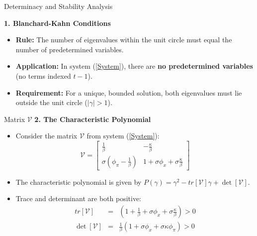\documentclass[11pt,aspectratio=169]{beamer}
\begin{document}
\begin{frame}{Determinacy and Stability Analysis}
\small

\textbf{1. Blanchard-Kahn Conditions}
\begin{itemize}
    \item \textbf{Rule:} The number of eigenvalues within the unit circle must equal the number of predetermined variables.
    \item \textbf{Application:} In system (\ref{System}), there are \textbf{no predetermined variables} (no terms indexed $t-1$).
    \item \textbf{Requirement:} For a unique, bounded solution, both eigenvalues must lie outside the unit circle ($|\gamma| > 1$).
\end{itemize}
\end{frame}
\begin{frame}{Matrix $\mathcal{V}$}
\small
    \textbf{2. The Characteristic Polynomial}
\begin{itemize}
    \item Consider the matrix $\mathcal{V}$ from system (\ref{System}):
    \begin{equation*}
    \mathcal{V}=\begin{bmatrix}
    \frac{1}{\beta } & -\frac{\kappa }{\beta } \\
    \sigma (\phi _{\pi }-\frac{1}{\beta }) & 1+\sigma \phi _{x}+\sigma \frac{\kappa }{\beta }
    \end{bmatrix}
    \end{equation*}
    \item The characteristic polynomial is given by $P(\gamma )=\gamma ^{2}-tr[\mathcal{V}]\gamma +\det [\mathcal{V}]$.
    \item Trace and determinant are both positive:
    \begin{eqnarray*}
    tr[\mathcal{V}] &=&\left( 1+\frac{1}{\beta }+\sigma \phi _{x}+\sigma \frac{\kappa }{\beta }\right) >0 \\
    \det [\mathcal{V}] &=&\frac{1}{\beta }\left( 1+\sigma \phi _{x}+\sigma \kappa \phi _{\pi }\right) >0
    \end{eqnarray*}
\end{itemize}
\end{frame}
\end{document}
